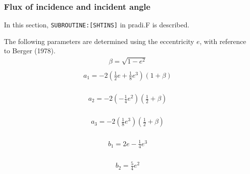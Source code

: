 \hypertarget{flux-of-incidence-and-incident-angle}{%
\subsubsection{Flux of incidence and incident
angle}\label{flux-of-incidence-and-incident-angle}}

In this section, \texttt{SUBROUTINE:{[}SHTINS{]}} in pradi.F is
described.

The following parameters are determined using the eccentricity \(e\),
with reference to Berger (1978). \begin{equation}
\begin{array}{l}
\beta=\sqrt{1-e^{2}} \\
\end{array}
\end{equation} \begin{equation}
\begin{array}{l}
a_{1}=-2\left(\frac{1}{2} e+\frac{1}{8} e^{3}\right)(1+\beta) \\
\end{array}
\end{equation}

\begin{equation}
\begin{array}{l}
a_{2}=-2\left(-\frac{1}{4} e^{2}\right)\left(\frac{1}{2}+\beta\right) \\
\end{array}
\end{equation}

\begin{equation}
\begin{array}{l}
a_{3}=-2\left(\frac{1}{8} e^{3}\right)\left(\frac{1}{2}+\beta\right) \\
\end{array}
\end{equation}

\begin{equation}
\begin{array}{l}
b_{1}=2 e-\frac{1}{4} e^{3} \\
\end{array}
\end{equation}

\begin{equation}
\begin{array}{l}
b_{2}=\frac{5}{4} e^{2} \\
\end{array}
\end{equation}

